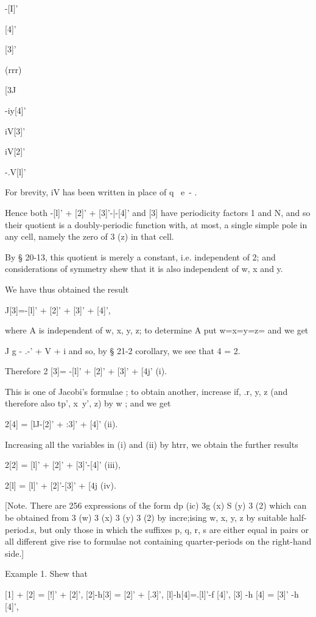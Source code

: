 -[I]' 


[4]' 


[3]' 


(rrr) 


 [3J 


-iy[4]' 


iV[3]' 


iV[2]' 


-.V[l]' 



For brevity, iV has been written in place of q~  e~- . 

Hence both -[l]' + [2]' + [3]'-|-[4]' and [3] have periodicity factors 1 and N, and so 
their quotient is a doubly-periodic function with, at most, a single simple pole in any cell, 
namely the zero of  3 (z) in that cell. 

By § 20-13, this quotient is merely a constant, i.e. independent of 2; and considerations 
of symmetry shew that it is also independent of w, x and y. 

We have thus obtained the result 

J[3]=-[l]' + [2]' + [3]' + [4]', 

where A is independent of w, x, y, z; to determine A put w=x=y=z=  and we get 

J g - .-' + V +  i  
and so, by § 21-2 corollary, we see that  4 = 2. 

Therefore 2 [3]= -[l]' + [2]' + [3]' + [4j' (i). 

This is one of Jacobi's formulae ; to obtain another, increase if, .r, y, z (and therefore 
also tp', x\ y', z) by  w ; and we get 

2[4] = [lJ-[2]' + :3]' + [4]' (ii). 

Increasing all the variables in (i) and (ii) by htrr, we obtain the further results 

2[2] = [l]' + [2]' + [3]'-[4]' (iii), 

2[l] = [l]' + [2]'-[3]' + [4j (iv). 

[Note. There are 256 expressions of the form dp (ic) 3g (x) S  (y) 3  (2) which can be 
obtained from  3 (w)  3 (x)  3 (y)  3 (2) by incre;ising w, x, y, z by suitable half-period.s, but 
only those in which the suffixes p, q, r, s are either equal in pairs or all different give rise 
to formulae not containing quarter-periods on the right-hand side.] 

Example 1. Shew that 

[1] + [2] = [!]' + [2]', [2]-h[3] = [2]' + [.3]', [l]-h[4]=.[l]'-f [4]', [3] -h [4] = [3]' -h [4]', 

